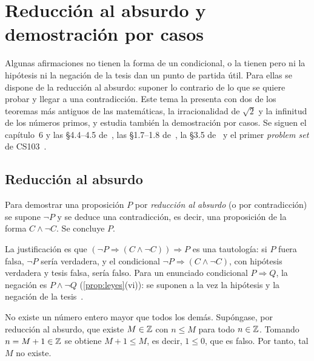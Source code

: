 \chapter{Reducción al absurdo y demostración por casos}
\label{tema:4}

Algunas afirmaciones no tienen la forma de un condicional, o la tienen pero ni la hipótesis ni la negación de la tesis dan un punto de partida útil. Para ellas se dispone de la reducción al absurdo: suponer lo contrario de lo que se quiere probar y llegar a una contradicción. Este tema la presenta con dos de los teoremas más antiguos de las matemáticas, la irracionalidad de $\sqrt2$ y la infinitud de los números primos, y estudia también la demostración por casos. Se siguen el capítulo~6 y las §4.4–4.5 de~\cite{hammack}, las §1.7–1.8 de~\cite{mcs}, la §3.5 de~\cite{velleman} y el primer \emph{problem set} de CS103~\cite{cs103}.

\section{Reducción al absurdo}

\begin{definicion}\label{def:absurdo}
Para demostrar una proposición $P$ por \emph{reducción al absurdo} (o por contradicción) se supone $\neg P$ y se deduce una contradicción, es decir, una proposición de la forma $C\wedge\neg C$. Se concluye $P$.
\end{definicion}

La justificación es que $(\neg P\Rightarrow(C\wedge\neg C))\Rightarrow P$ es una tautología: si $P$ fuera falsa, $\neg P$ sería verdadera, y el condicional $\neg P\Rightarrow(C\wedge\neg C)$, con hipótesis verdadera y tesis falsa, sería falso. Para un enunciado condicional $P\Rightarrow Q$, la negación es $P\wedge\neg Q$ (\cref{prop:leyes}(vi)): se suponen a la vez la hipótesis y la negación de la tesis~\cite[§6.2]{hammack}.

\begin{ejemplo}\label{ej:no-mayor}
No existe un número entero mayor que todos los demás. Supóngase, por reducción al absurdo, que existe $M\in\mathbb{Z}$ con $n\le M$ para todo $n\in\mathbb{Z}$. Tomando $n=M+1\in\mathbb{Z}$ se obtiene $M+1\le M$, es decir, $1\le 0$, que es falso. Por tanto, tal $M$ no existe.
\end{ejemplo}

